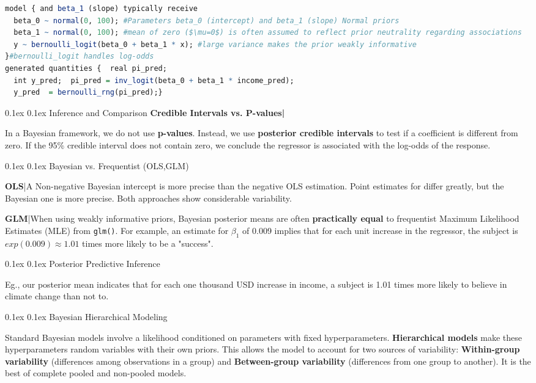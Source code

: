 \documentclass[8pt,landscape]{article}
\makeatletter
\renewcommand{\section}{\@startsection{section}{2}{0pt}%
    {0.1ex}%
    {0.1ex}%
    {\fontsize{8}{9}\bfseries\color{red}}} %
\renewcommand{\subsection}{\@startsection{subsection}{2}{0pt}%
    {0.1ex}%
    {0.1ex}%
    {\fontsize{8}{9}\bfseries\color{blue}}} %
\newcommand{\code}[1]{\textcolor{myred}{\texttt{#1}}}
\newcommand{\smalltext}[1]{
  {\fontsize{8}{9}\selectfont\sloppy #1\par}
}
\makeatother
\begin{document}
\begin{multicols}{3}
\begin{lstlisting}[language=R]
model { and beta_1 (slope) typically receive 
  beta_0 ~ normal(0, 100); #Parameters beta_0 (intercept) and beta_1 (slope) Normal priors
  beta_1 ~ normal(0, 100); #mean of zero ($\mu=0$) is often assumed to reflect prior neutrality regarding associations
  y ~ bernoulli_logit(beta_0 + beta_1 * x); #large variance makes the prior weakly informative
}#bernoulli_logit handles log-odds
generated quantities {  real pi_pred;
  int y_pred;  pi_pred = inv_logit(beta_0 + beta_1 * income_pred);
  y_pred  = bernoulli_rng(pi_pred);}
\end{lstlisting}

\subsection{Inference and Comparison}
\textbf{Credible Intervals vs. P-values|}
\smalltext{
In a Bayesian framework, we do not use \textbf{p-values}. Instead, we use \textbf{posterior credible intervals} to test if a coefficient is different from zero. If the 95\% credible interval does not contain zero, we conclude the regressor is associated with the log-odds of the response.
}

\subsection{Bayesian vs. Frequentist (OLS,GLM)}
\smalltext{ 
\textbf{OLS}|A Non-negative Bayesian intercept is more precise than the negative OLS estimation.
Point estimates for differ greatly, but the Bayesian one is more precise.
Both approaches show considerable variability.

\textbf{GLM}|When using weakly informative priors, Bayesian posterior means are often \textbf{practically equal} to frequentist Maximum Likelihood Estimates (MLE) from \code{glm()}. For example, an estimate for $\beta_1$ of 0.009 implies that for each unit increase in the regressor, the subject is $exp(0.009) \approx 1.01$ times more likely to be a "success".
}

\subsection{Posterior Predictive Inference}
\smalltext{Eg.,
our posterior mean indicates that for each one thousand USD increase in income, a subject is 1.01 times more likely to believe in climate change than not to.
}

\section{Bayesian Hierarchical Modeling}
\smalltext{
Standard Bayesian models involve a likelihood conditioned on parameters with fixed hyperparameters. \textbf{Hierarchical models} make these hyperparameters random variables with their own priors. This allows the model to account for two sources of variability: \textbf{Within-group variability} (differences among observations in a group) and \textbf{Between-group variability} (differences from one group to another). It is the best of complete pooled and non-pooled models.
}


\end{multicols}
\end{document}
